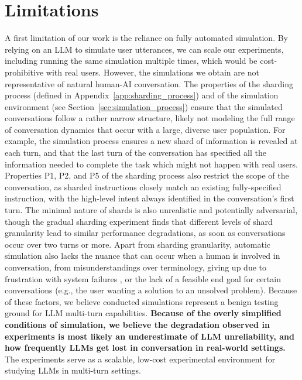\documentclass{article}
\begin{document}

\section{Limitations} \label{sec:limitations}

A first limitation of our work is the reliance on fully automated simulation. By relying on an LLM to simulate user utterances, we can scale our experiments, including running the same simulation multiple times, which would be cost-prohibitive with real users. However, the simulations we obtain are not representative of natural human-AI conversation. The properties of the sharding process (defined in Appendix~\ref{app:sharding_process}) and of the simulation environment (see Section~\ref{sec:simulation_process}) ensure that the simulated conversations follow a rather narrow structure, likely not modeling the full range of conversation dynamics that occur with a large, diverse user population. For example, the simulation process ensures a new shard of information is revealed at each turn, and that the last turn of the conversation has specified all the information needed to complete the task which might not happen with real users. Properties P1, P2, and P5 of the sharding process also restrict the scope of the conversation, as sharded instructions closely match an existing fully-specified instruction, with the high-level intent always identified in the conversation's first turn. The minimal nature of shards is also unrealistic and potentially adversarial, though the gradual sharding experiment finds that different levels of shard granularity lead to similar performance degradations, as soon as conversations occur over two turns or more.
Apart from sharding granularity, automatic simulation also lacks the nuance that can occur when a human is involved in conversation, from misunderstandings over terminology, giving up due to frustration with system failures \cite{wester2024ai}, or the lack of a feasible end goal for certain conversations (e.g., the user wanting a solution to an unsolved problem). Because of these factors, we believe conducted simulations represent a benign testing ground for LLM multi-turn capabilities. \textbf{Because of the overly simplified conditions of simulation, we believe the degradation observed in experiments is most likely an underestimate of LLM unreliability, and how frequently LLMs get lost in conversation in real-world settings.} The experiments serve as a scalable, low-cost experimental environment for studying LLMs in multi-turn settings.
\end{document}
